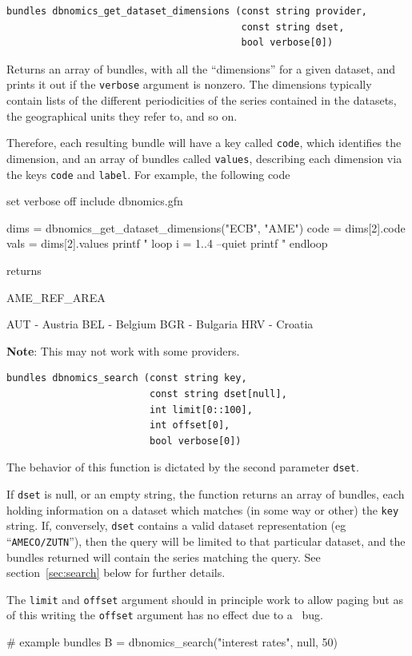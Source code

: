 \documentclass{article}
\begin{document}
\begin{funcdoc}
\begin{verbatim}
bundles dbnomics_get_dataset_dimensions (const string provider,
                                         const string dset,
                                         bool verbose[0])
\end{verbatim}
Returns an array of bundles, with all the ``dimensions'' for a given
dataset, and prints it out if the \texttt{verbose} argument is
nonzero. The dimensions typically contain lists of the different
periodicities of the series contained in the datasets, the
geographical units they refer to, and so on.

Therefore, each resulting bundle will have a key called \texttt{code},
which identifies the dimension, and an array of bundles called
\texttt{values}, describing each dimension via the keys \texttt{code}
and \texttt{label}. For example, the following code
\begin{code}
set verbose off
include dbnomics.gfn

dims = dbnomics_get_dataset_dimensions("ECB", "AME")
code = dims[2].code
vals = dims[2].values
printf "%
loop i = 1..4 --quiet
    printf "%
endloop
\end{code}

returns

\begin{code}
AME_REF_AREA

AUT - Austria
BEL - Belgium
BGR - Bulgaria
HRV - Croatia
\end{code}

\textbf{Note}: This may not work with some providers.
\end{funcdoc}

\begin{funcdoc}
\begin{verbatim}
bundles dbnomics_search (const string key,
                         const string dset[null],
                         int limit[0::100],
                         int offset[0],
                         bool verbose[0])
\end{verbatim}
  The behavior of this function is dictated by the second parameter
  \texttt{dset}.

  If \texttt{dset} is null, or an empty string, the function
  returns an array of bundles, each holding information on a dataset
  which matches (in some way or other) the \texttt{key} string. If,
  conversely, \texttt{dset} contains a valid dataset representation
  (eg ``\texttt{AMECO/ZUTN}''), then the query will be limited to that
  particular dataset, and the bundles returned will contain the series
  matching the query. See section~\ref{sec:search} below for further
  details.

  The \texttt{limit} and \texttt{offset} argument should in principle
  work to allow paging but as of this writing the \texttt{offset}
  argument has no effect due to a \DB\ bug.
\begin{code}
# example
bundles B = dbnomics_search("interest rates", null, 50)
\end{code}
\end{funcdoc}
\end{document}
